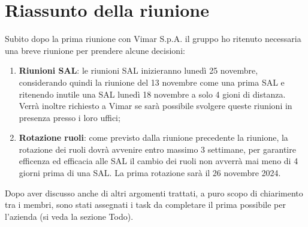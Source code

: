 \section{Riassunto della riunione}
Subito dopo la prima riunione con Vimar S.p.A. il gruppo ho ritenuto necessaria una breve riunione per prendere alcune decisioni:

\begin{enumerate}
    \item \textbf{Riunioni SAL}: le riunioni SAL inizieranno lunedì 25 novembre, considerando quindi la riunione del 13 novembre come una prima SAL e ritenendo inutile una SAL lunedì 18 novembre a solo 4 gioni di distanza. Verrà inoltre richiesto a Vimar se sarà possibile svolgere queste riunioni in presenza presso i loro uffici;

    \item \textbf{Rotazione ruoli}: come previsto dalla riunione precedente la riunione, la rotazione dei ruoli dovrà avvenire entro massimo 3 settimane, per garantire efficenza ed efficacia alle SAL il cambio dei ruoli non avverrà mai meno di 4 giorni prima di una SAL. La prima rotazione sarà il 26 novembre 2024.

\end{enumerate}

Dopo aver discusso anche di altri argomenti trattati, a puro scopo di chiarimento tra i membri, sono stati assegnati i task da completare il prima possibile per l'azienda (si veda la sezione Todo).
